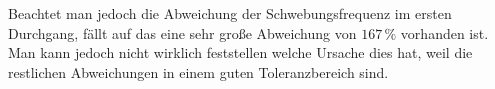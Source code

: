 \begin{flushleft}
    Beachtet man jedoch die Abweichung der Schwebungsfrequenz im ersten Durchgang, fällt auf das eine sehr große Abweichung von $ 167\,\% $ vorhanden ist. 
    Man kann jedoch nicht wirklich feststellen welche Ursache dies hat, weil die restlichen Abweichungen in einem guten Toleranzbereich sind.
\end{flushleft} 